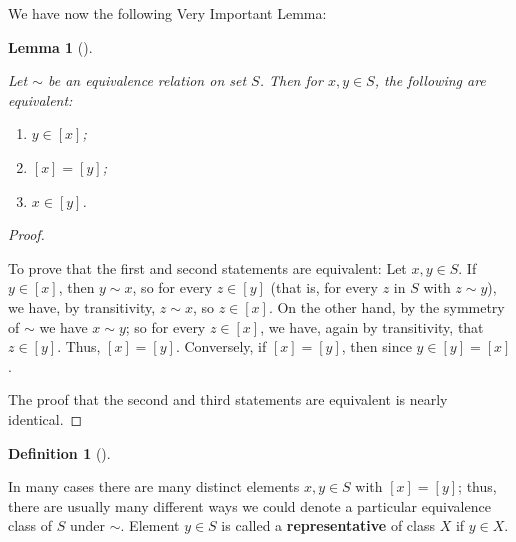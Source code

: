 \documentclass[10pt,]{book}
\newcommand{\terminology}[1]{\textbf{#1}}
\theoremstyle{plain}
\newtheorem{lemma}[theorem]{Lemma}
\theoremstyle{definition}
\newtheorem{definition}[theorem]{Definition}
\theoremstyle{definition}
\theoremstyle{definition}
\theoremstyle{definition}
\numberwithin{equation}{section}
\begin{document}
    We have now the following Very Important
    Lemma:
\begin{lemma}[{}]\label{vil_lem}

        Let \(\sim\) be an equivalence relation on set \(S\). Then for \(x,y\in S\), the following are equivalent:

\leavevmode%
\begin{enumerate}
\item\hypertarget{li-399}{}\(y\in [x]\);%
\item\hypertarget{li-400}{}\([x]=[y]\);%
\item\hypertarget{li-401}{}\(x\in [y]\).%
\end{enumerate}

%
\end{lemma}
\begin{proof}\hypertarget{proof-35}{}

      To prove that the first and second statements are equivalent: Let \(x, y\in S\). If \(y\in
      [x]\), then \(y \sim x\), so for every \(z\in [y]\) (that is, for every
      \(z\) in \(S\) with \(z\sim y\)), we have, by transitivity, \(z\sim x\), so
      \(z\in [x]\). On the other hand, by the symmetry of \(\sim\) we have
      \(x\sim y\); so for every \(z\in [x]\), we have, again by transitivity,
      that \(z\in [y]\). Thus, \([x]=[y]\). Conversely, if \([x]=[y]\), then
      since \(y\in [y]=[x]\).
\par

      The proof that the second and third statements are equivalent is nearly
      identical.
\end{proof}
\begin{definition}[{}]\label{definition-57}

    In many cases there are
    many distinct elements \(x,y\in S\) with \([x]=[y]\); thus, there
    are usually many different ways we could denote a particular
    equivalence class of \(S\) under \(\sim\). Element \(y\in S\) is
    called a \terminology{representative} of class \(X\) if \(y\in X\).
\end{definition}
\end{document}
